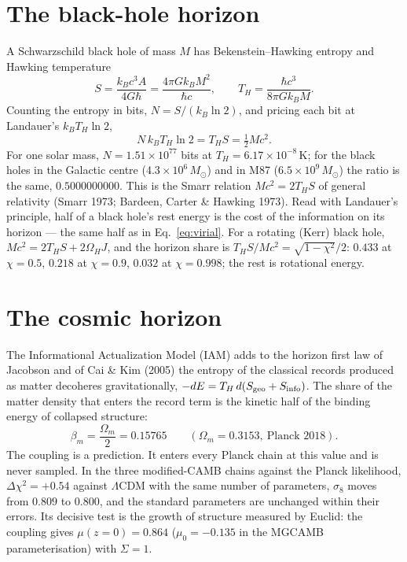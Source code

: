 \documentclass[11pt,a4paper]{article}
\begin{document}
\section{The black-hole horizon}
A Schwarzschild black hole of mass $M$ has Bekenstein--Hawking entropy and Hawking temperature
\begin{equation}
S=\frac{k_Bc^3A}{4G\hbar}=\frac{4\pi Gk_BM^2}{\hbar c},\qquad T_H=\frac{\hbar c^3}{8\pi Gk_BM}.
\end{equation}
Counting the entropy in bits, $N=S/(k_B\ln2)$, and pricing each bit at Landauer's $k_BT_H\ln2$,
\begin{equation}
N\,k_BT_H\ln2=T_HS=\tfrac12Mc^2 .
\end{equation}
For one solar mass, $N=1.51\times10^{77}$ bits at $T_H=6.17\times10^{-8}$\,K; for the black holes in the Galactic centre ($4.3\times10^6\,M_\odot$) and in
M87 ($6.5\times10^9\,M_\odot$) the ratio is the same, $0.5000000000$. This is the Smarr relation $Mc^2=2T_HS$ of general relativity (Smarr 1973;
Bardeen, Carter \& Hawking 1973). Read with Landauer's principle, half of a black hole's rest energy is the cost of the information on its horizon --- the
same half as in Eq.~\eqref{eq:virial}. For a rotating (Kerr) black hole, $Mc^2=2T_HS+2\Omega_HJ$, and the horizon share is $T_HS/Mc^2=\sqrt{1-\chi^2}/2$:
$0.433$ at $\chi=0.5$, $0.218$ at $\chi=0.9$, $0.032$ at $\chi=0.998$; the rest is rotational energy.

\section{The cosmic horizon}
The Informational Actualization Model (IAM) adds to the horizon first law of Jacobson and of Cai \& Kim (2005) the entropy of the classical records produced as
matter decoheres gravitationally, $-dE=T_H\,d(S_{\rm geo}+S_{\rm info})$. The share of the matter density that enters the record term is the kinetic half of
the binding energy of collapsed structure:
\begin{equation}
\beta_m=\frac{\Omega_m}{2}=0.15765\qquad(\Omega_m=0.3153,\ \text{Planck 2018}).
\end{equation}
The coupling is a prediction. It enters every Planck chain at this value and is never sampled. In the three modified-CAMB chains against the Planck likelihood,
$\Delta\chi^2=+0.54$ against $\Lambda$CDM with the same number of parameters, $\sigma_8$ moves from $0.809$ to $0.800$, and the standard parameters
are unchanged within their errors. Its decisive test is the growth of structure measured by Euclid: the coupling gives $\mu(z{=}0)=0.864$
($\mu_0=-0.135$ in the MGCAMB parameterisation) with $\Sigma=1$.
\end{document}
